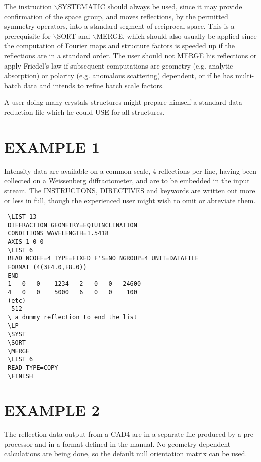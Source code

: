 \documentclass[10pt,a4paper]{report}
\begin{document}
The instruction $\backslash$SYSTEMATIC should always be used, since it may provide
 confirmation of the space group, and moves reflections, by the permitted
 symmetry operators, into a standard segment of reciprocal space. This
 is a prerequisite for $\backslash$SORT and $\backslash$MERGE, which should also usually be applied
 since the computation of Fourier maps and structure factors is speeded
 up if the reflections are in a standard order. The user should not MERGE
 his reflections or apply Friedel's law if subsequent computations are geometry
 (e.g. analytic absorption) or polarity (e.g. anomalous scattering) dependent,
 or if he has multi-batch data and intends to refine batch scale factors.


A user doing many crystals structures might prepare himself a standard
 data reduction file which he could USE for all structures.



\section{EXAMPLE 1}





Intensity data are available on a common scale, 4 reflections per line, having been collected on a Weissenberg diffractometer, and are to
 be embedded in the input stream. The INSTRUCTONS, DIRECTIVES and keywords
 are written out more or less in full, though the experienced user might
 wish to omit or abreviate them.

\small\begin{verbatim} 
 \LIST 13
 DIFFRACTION GEOMETRY=EQIUINCLINATION
 CONDITIONS WAVELENGTH=1.5418
 AXIS 1 0 0
 \LIST 6
 READ NCOEF=4 TYPE=FIXED F'S=NO NGROUP=4 UNIT=DATAFILE
 FORMAT (4(3F4.0,F8.0))
 END
 1   0   0    1234   2   0   0   24600   
 4   0   0    5000   6   0   0    100
 (etc)
 -512 
 \ a dummy reflection to end the list
 \LP
 \SYST
 \SORT
 \MERGE
 \LIST 6
 READ TYPE=COPY
 \FINISH
\end{verbatim}\normalsize


\section{EXAMPLE 2}


The reflection data output from a CAD4 are in a separate file produced 
 by a pre-processor and in a format defined in the manual. No geometry
 dependent calculations are being done, so the default null orientation matrix
 can be used.
\end{document}
